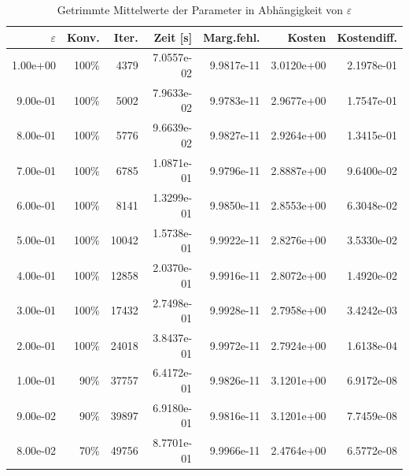 \begin{table}[htbp]
\caption{Getrimmte Mittelwerte der Parameter in Abhängigkeit von $\varepsilon$}
\label{tab:Parametertest128_tol1e-10}
\small
\centering
{}
\begin{tabular}{rrrrrrr}
\toprule
$\varepsilon$ & Konv. & Iter. & Zeit [s] & Marg.fehl. & Kosten & Kostendiff. \\
\midrule
1.00e+00 & 100\% & 4379 & 7.0557e-02 & 9.9817e-11 & 3.0120e+00 & 2.1978e-01 \\
9.00e-01 & 100\% & 5002 & 7.9633e-02 & 9.9783e-11 & 2.9677e+00 & 1.7547e-01 \\
8.00e-01 & 100\% & 5776 & 9.6639e-02 & 9.9827e-11 & 2.9264e+00 & 1.3415e-01 \\
7.00e-01 & 100\% & 6785 & 1.0871e-01 & 9.9796e-11 & 2.8887e+00 & 9.6400e-02 \\
6.00e-01 & 100\% & 8141 & 1.3299e-01 & 9.9850e-11 & 2.8553e+00 & 6.3048e-02 \\
5.00e-01 & 100\% & 10042 & 1.5738e-01 & 9.9922e-11 & 2.8276e+00 & 3.5330e-02 \\
4.00e-01 & 100\% & 12858 & 2.0370e-01 & 9.9916e-11 & 2.8072e+00 & 1.4920e-02 \\
3.00e-01 & 100\% & 17432 & 2.7498e-01 & 9.9928e-11 & 2.7958e+00 & 3.4242e-03 \\
2.00e-01 & 100\% & 24018 & 3.8437e-01 & 9.9972e-11 & 2.7924e+00 & 1.6138e-04 \\
1.00e-01 & 90\% & 37757 & 6.4172e-01 & 9.9826e-11 & 3.1201e+00 & 6.9172e-08 \\
9.00e-02 & 90\% & 39897 & 6.9180e-01 & 9.9816e-11 & 3.1201e+00 & 7.7459e-08 \\
8.00e-02 & 70\% & 49756 & 8.7701e-01 & 9.9966e-11 & 2.4764e+00 & 6.5772e-08 \\
\bottomrule
\end{tabular}
\end{table}
